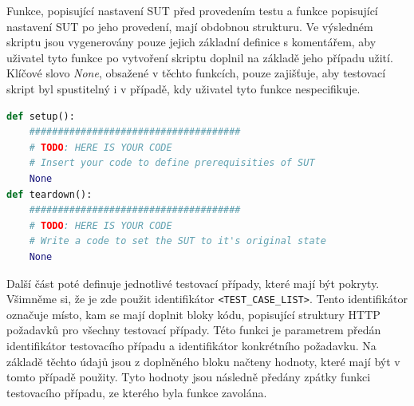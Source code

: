Funkce, popisující nastavení SUT před provedením testu a funkce popisující nastavení SUT po jeho provedení, mají obdobnou strukturu. Ve výsledném skriptu jsou vygenerovány pouze jejich základní definice s komentářem, aby uživatel tyto funkce po vytvoření skriptu doplnil na základě jeho případu užití. Klíčové slovo \textit{None}, obsažené v těchto funkcích, pouze zajišťuje, aby testovací skript byl spustitelný i v případě, kdy uživatel tyto funkce nespecifikuje.
\begin{lstlisting}[language=Python, frame=single]
def setup():
    #####################################
    # TODO: HERE IS YOUR CODE
    # Insert your code to define prerequisities of SUT
    None
def teardown():
    #####################################
    # TODO: HERE IS YOUR CODE
    # Write a code to set the SUT to it's original state
    None
\end{lstlisting}


Další část poté definuje jednotlivé testovací případy, které mají být pokryty. Všimněme si, že je zde použit identifikátor \texttt{<TEST\_CASE\_LIST>}. Tento identifikátor označuje místo, kam se mají doplnit bloky kódu, popisující struktury HTTP požadavků pro všechny testovací případy. Této funkci je parametrem předán identifikátor testovacího případu a identifikátor konkrétního požadavku. Na základě těchto údajů jsou z doplněného bloku načteny hodnoty, které mají být v tomto případě použity. Tyto hodnoty jsou následně předány zpátky funkci testovacího případu, ze kterého byla funkce zavolána.




